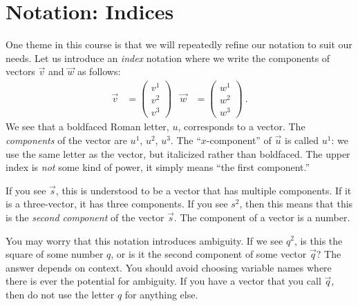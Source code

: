\section{Notation: Indices}

One theme in this course is that we will repeatedly refine our notation to suit our needs. Let us introduce an \emph{index} notation where we write the components of vectors $\vec{v}$ and $\vec{w}$ as follows:
\begin{align}
    \vec{v}
    &=
    \begin{pmatrix}
        v^1 \\ v^2 \\ v^3
    \end{pmatrix}
    &
    \vec{w}
    &=
    \begin{pmatrix}
        w^1 \\ w^2 \\ w^3
    \end{pmatrix} \ .
\end{align}
We see that a boldfaced Roman letter, $u$, corresponds to a vector. The \emph{components} of the vector are $u^1$, $u^2$, $u^3$. The ``$x$-component'' of $\vec{u}$ is called $u^1$: we use the same letter as the vector, but italicized rather than boldfaced. The upper index is \emph{not} some kind of power, it simply means ``the first component.'' 

\begin{example}
If you see $\vec{s}$, this is understood to be a vector that has multiple components. If it is a three-vector, it has three components. If you see $s^2$, then this means that this is the \emph{second component} of the vector $\vec{s}$. The component of a vector is a number. 
\end{example}

You may worry that this notation introduces ambiguity. If we see $q^2$, is this the square of some number $q$, or is it the second component of some vector $\vec{q}$? The answer depends on context. You should avoid choosing variable names where there is ever the potential for ambiguity. If you have a vector that you call $\vec{q}$, then do not use the letter $q$ for anything else.

